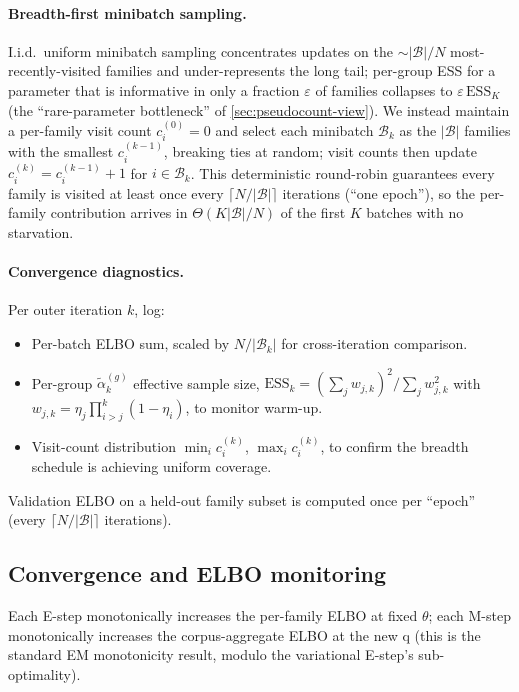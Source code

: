 \paragraph{Breadth-first minibatch sampling.}
I.i.d.\ uniform minibatch sampling concentrates updates on the
$\sim |\mathcal{B}|/N$ most-recently-visited families and
under-represents the long tail; per-group ESS for a parameter that
is informative in only a fraction $\varepsilon$ of families
collapses to $\varepsilon\,\mathrm{ESS}_K$ (the ``rare-parameter
bottleneck'' of \cref{sec:pseudocount-view}). We instead maintain a
per-family visit count $c_i^{(0)} = 0$ and select each minibatch
$\mathcal{B}_k$ as the $|\mathcal{B}|$ families with the smallest
$c_i^{(k-1)}$, breaking ties at random; visit counts then update
$c_i^{(k)} = c_i^{(k-1)} + 1$ for $i \in \mathcal{B}_k$. This
deterministic round-robin guarantees every family is visited at
least once every $\lceil N/|\mathcal{B}|\rceil$ iterations
(``one epoch''), so the per-family contribution arrives in
$\Theta(K|\mathcal{B}|/N)$ of the first $K$ batches with no
starvation.

\paragraph{Convergence diagnostics.}
Per outer iteration $k$, log:
\begin{itemize}[nosep]
\item Per-batch ELBO sum, scaled by $N/|\mathcal{B}_k|$ for
   cross-iteration comparison.
\item Per-group $\tilde{\alpha}^{(g)}_k$ effective sample size,
   $\mathrm{ESS}_k = (\sum_j w_{j,k})^2 / \sum_j w_{j,k}^2$ with
   $w_{j,k} = \eta_j \prod_{i>j}^k (1-\eta_i)$, to monitor warm-up.
\item Visit-count distribution $\min_i c_i^{(k)}$, $\max_i c_i^{(k)}$,
   to confirm the breadth schedule is achieving uniform coverage.
\end{itemize}
Validation ELBO on a held-out family subset is computed once per
``epoch'' (every $\lceil N/|\mathcal{B}|\rceil$ iterations).

\subsection{Convergence and ELBO monitoring}
\label{sec:vbem-convergence}

Each E-step monotonically increases the per-family ELBO at fixed
$\theta$; each M-step monotonically increases the corpus-aggregate
ELBO at the new q (this is the standard EM monotonicity result, modulo
the variational E-step's sub-optimality).

